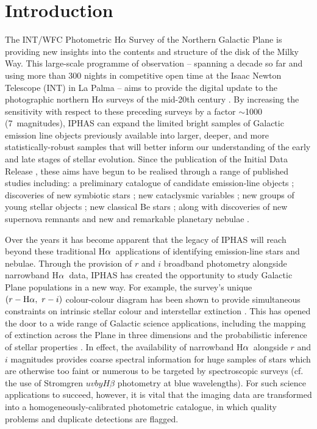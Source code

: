 \documentclass[a4paper,useAMS,usenatbib]{mn2e}
\def\ha{\mbox{H$\rm \alpha$}}
\begin{document}
\section{Introduction}
The INT/WFC Photometric H$\alpha$ Survey
of the Northern Galactic Plane \citep[IPHAS;][]{Drew2005}
is providing new insights into the contents and structure of the disk of the Milky Way.
This large-scale programme of observation
-- spanning a decade so far 
and using more than 300 nights in competitive open time 
at the Isaac Newton Telescope (INT) in La Palma --
aims to provide the digital update 
to the photographic northern H$\alpha$ surveys 
of the mid-20th century \citep[see][]{Kohoutek1999}. 
By increasing the sensitivity 
with respect to these preceding surveys 
by a factor $\sim$1000 (7~magnitudes), 
IPHAS can expand
the limited bright samples of Galactic emission line objects 
previously available into larger, deeper,
and more statistically-robust samples
that will better inform our understanding 
of the early and late stages of stellar evolution.
Since the publication of the Initial Data Release \citep[IDR;][]{Gonzalez-Solares2008},
these aims have begun to be realised through a
range of published studies including: 
a preliminary catalogue of candidate emission-line objects \citep{Witham2008};
discoveries of new symbiotic stars \citep{Corradi2008, Corradi2010, Corradi2011, Rodriguez2014}; 
new cataclysmic variables \citep{Witham2007,Wesson2008,Aungwerojwit2012}; 
new groups of young stellar objects
\citep{Vink2008,Barentsen2011a,Wright2012};
new classical Be stars \citep{Raddi2013};
along with discoveries of new supernova remnants \citep{Sabin2013}
and new and remarkable planetary nebulae 
\citep{Mampaso2006, Viironen2009a, Viironen2009b, Sabin2010, Corradi2011, Viironen2011,Sabin2014}.

Over the years it has become apparent that the legacy of IPHAS 
will reach beyond these traditional \ha\ applications 
of identifying emission-line stars and nebulae. 
Through the provision of $r$ and $i$ broadband photometry 
alongside narrowband \ha\ data,
IPHAS has created the opportunity 
to study Galactic Plane populations 
in a new way.
For example, the survey's unique $(r-\ha,\ r-i)$ colour-colour
diagram has been shown to provide simultaneous constraints 
on intrinsic stellar colour and interstellar extinction \citep{Drew2008}. 
This has opened the door 
to a wide range of Galactic science applications, 
including the mapping of extinction across the Plane in three dimensions
and the probabilistic inference of stellar properties
\citep{Sale2009, Sale2010, Giammanco2011, Sale2012, Barentsen2013, Sale2014}. 
In effect, the availability of narrowband \ha\
alongside $r$ and $i$ magnitudes
provides coarse spectral information for huge samples of stars 
which are otherwise too faint or numerous 
to be targeted by spectroscopic surveys (cf. the use of
Stromgren $uvbyH\beta$ photometry at blue wavelengths).
For such science applications to succeed, however, 
it is vital that the imaging data are transformed 
into a homogeneously-calibrated photometric catalogue, 
in which quality problems 
and duplicate detections are flagged. 
\end{document}
